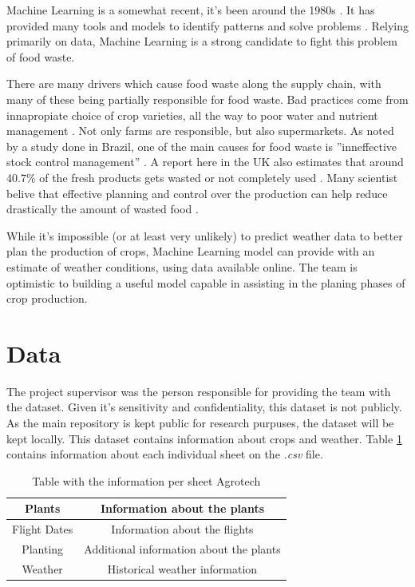 \documentclass{article}
\begin{document}
Machine Learning is a somewhat recent, it's been around the 1980s \cite{mlBook}. It has
provided many tools and models to identify patterns and solve problems \cite{mlBookTwo}.
Relying primarily on data, Machine Learning is a strong candidate to fight this problem of
food waste.

There are many drivers which cause food waste along the supply chain, with many of these
being partially responsible for food waste. Bad practices come from innapropiate choice of
crop varieties, all the way to poor water and nutrient management \cite{foodLoss}.
Not only farms are responsible, but also supermarkets. As noted by a study done in Brazil,
one of the main causes for food waste is ”inneffective stock control management” \cite{brazfood}.
A report here in the UK also estimates that around 40.7\% of the fresh products gets wasted or not
completely used \cite{ukarticle}. Many scientist belive that effective planning and control
over the production can help reduce drastically the amount of wasted food \cite{savingFood}.

While it's impossible (or at least very unlikely) to predict weather data to better plan
the production of crops, Machine Learning model can provide with an estimate of weather
conditions, using data available online. The team is optimistic to building a useful model
capable in assisting in the planing phases of crop production.

\section{Data}

The project supervisor was the person responsible for providing the team with the dataset.
Given it's sensitivity and confidentiality, this dataset is not publicly. As the main
repository is kept public for research purpuses, the dataset will be kept locally. This
dataset contains information about crops and weather. Table \ref{table:1} contains
information about each individual sheet on the \emph{.csv} file.

\begin{table}[h]
    \centering
    \begin{tabular}{ | c | c |}
        \hline
        Plants & Information about the plants \\
        \hline
        Flight Dates & Information about the flights \\
        \hline
        Planting & Additional information about the plants \\
        \hline
        Weather & Historical weather information \\
        \hline
    \end{tabular}
    \caption{Table with the information per sheet Agrotech}
    \label{table:1}
\end{table}
\end{document}
